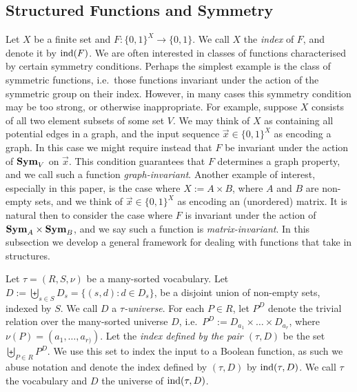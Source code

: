 \documentclass[../paper.tex]{subfiles}
\begin{document}


\subsection{Structured Functions and Symmetry}
Let $X$ be a finite set and $F: \{0,1\}^{X} \rightarrow \{0,1\}$. We call $X$
the \emph{index} of $F$, and denote it by $\text{\upshape ind}(F)$. We are often interested in
classes of functions characterised by certain symmetry conditions. Perhaps the
simplest example is the class of symmetric functions, i.e.\ those functions
invariant under the action of the symmetric group on their index. However, in
many cases this symmetry condition may be too strong, or otherwise
inappropriate. For example, suppose $X$ consists of all two element subsets of
some set $V$. We may think of $X$ as containing all potential edges in a graph,
and the input sequence $ \vec{x} \in \{0,1\}^X$ as encoding a graph. In this
case we might require instead that $F$ be invariant under the action of $\text{\textbf{Sym}}_V$
on $\vec{x}$. This condition guarantees that $F$ determines a graph property,
and we call such a function \emph{graph-invariant}. Another example of interest,
especially in this paper, is the case where $X := A \times B$, where $A$ and $B$
are non-empty sets, and we think of $\vec{x} \in \{0,1\}^X$ as encoding an
(unordered) matrix. It is natural then to consider the case where $F$ is
invariant under the action of $\text{\textbf{Sym}}_A \times \text{\textbf{Sym}}_B$, and we say such a function
is \emph{matrix-invariant}. In this subsection we develop a general framework
for dealing with functions that take in structures.

Let $\tau = (R, S, \nu)$ be a many-sorted vocabulary.
Let $D := \biguplus_{s \in S} D_{s} = \{(s,d) : d \in D_s\}$, be a disjoint
union of non-empty sets, indexed by $S$. We call $D$ a \emph{$\tau$-universe}.
For each $P \in R$, let $P^D$ denote the trivial relation over the many-sorted
universe $D$, i.e.\ $P^D := D_{a_1} \times \ldots \times D_{a_{r}}$, where
$\nu(P) = (a_1, \ldots , a_{r)})$. Let the \emph{index defined by the pair
  $(\tau, D)$} be the set $\biguplus_{P\in R} P^{D}$. We use this set to index
the input to a Boolean function, as such we abuse notation and denote the index
defined by $(\tau, D)$ by $\text{\upshape ind}(\tau, D)$. We call $\tau$ the vocabulary and $D$
the universe of $\text{\upshape ind}(\tau, D)$.
\end{document}
